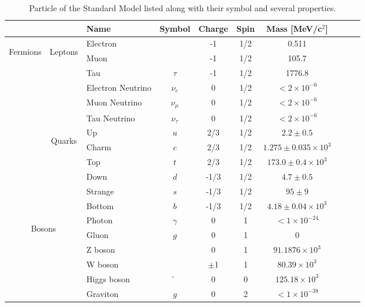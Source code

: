 \begin{table}[htp]
\begin{center}
\caption{Particle of the Standard Model listed along with their symbol and several properties.}
{\footnotesize
\begin{tabular}{c c l c c c c c c c}
\toprule
& & Name & Symbol & Charge & Spin & Mass [MeV/c$^2$] \\
\midrule
\multirow{12}{*}[0em]{\begin{sideways}Fermions\end{sideways}} & \multirow{6}{*}[0em]{\begin{sideways}Leptons\end{sideways}} & Electron & \e & -1 & 1/2 & 0.511 \\
& & Muon   			  & \m         & -1 & 1/2 & 105.7 \\
& & Tau    			  & $\tau$     & -1 & 1/2 & 1776.8 \\
& & Electron Neutrino & $\nu_e$    & 0  & 1/2 &  $<2\times10^{-6}$\\
& & Muon Neutrino     & $\nu_\mu$  & 0  & 1/2 &  $<2\times10^{-6}$\\
& & Tau Neutrino      & $\nu_\tau$ & 0  & 1/2 &  $<2\times10^{-6}$\\
\cline{2-7} 
& \multirow{6}{*}[0em]{\begin{sideways}Quarks\end{sideways}} & Up & $u$ & 2/3 & 1/2 &  $2.2\pm0.5$ \\
& & Charm             & $c$ &  2/3 & 1/2 &  $1.275\pm0.035\times10^{3}$ \\
& & Top               & $t$ &  2/3 & 1/2 &  $173.0\pm0.4\times10^{3}$ \\
& & Down              & $d$ & -1/3 & 1/2 &  $4.7\pm0.5$ \\
& & Strange           & $s$ & -1/3 & 1/2 &  $95\pm9$ \\
& & Bottom            & $b$ & -1/3 & 1/2 &  $4.18\pm0.04\times10^{3}$ \\
\midrule
\multicolumn{2}{c}{\multirow{6}{*}[0em]{\begin{sideways}Bosons\end{sideways}}} & Photon & $\gamma$ & 0 & 1 & $<1\times10^{-24}$ \\
& & Gluon         & $g$ & 0 & 1 & 0 \\
& & Z boson       & \Z  & 0 & 1 & $91.1876\times 10^3$ \\
& & W boson       & \W  & $\pm$1 & 1 & $80.39\times 10^3$ \\
& & Higgs boson   & \h  & 0 & 0 & $125.18\times 10^3$ \\
& & Graviton      & $g$ & 0 & 2 & $<1\times 10^{-38}$ \\
\bottomrule
\end{tabular}
}
\label{tab:particles}
\end{center}
\end{table}

